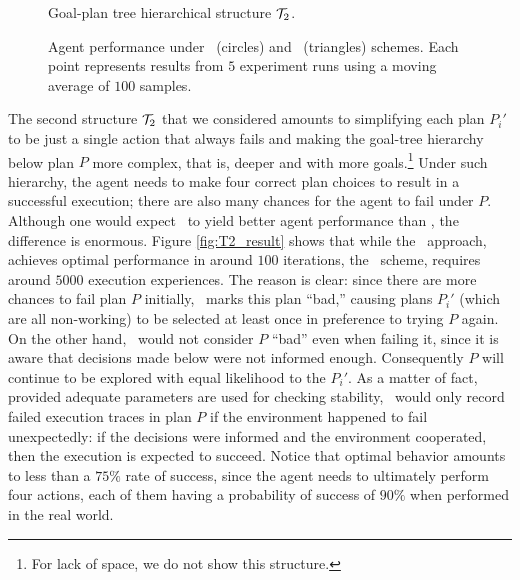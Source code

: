 \begin{figure}[t]
\begin{center}

\end{center}
\caption{Goal-plan tree hierarchical structure $\T_2$.}
\label{fig:T2}
\end{figure}


\begin{figure*}[t]
\begin{center}
\subfigure[Structure $\T_1$]{\label{fig:T1_result}

}
\qquad
\subfigure[Structure $\T_2$]{\label{fig:T2_result}

}
\qquad
\subfigure[Structure $\T_3$]{\label{fig:T3_result}

}
\caption{Agent performance under \BUL\ (circles) and \CL\ (triangles) schemes.
Each point represents results from $5$ experiment runs using a moving average of $100$ samples.}
\end{center}
\end{figure*}


The second structure $\T_2$ that we considered amounts to simplifying
each plan $P_i'$ to be just a single action that always fails and
making the goal-tree hierarchy below plan $P$ more complex, that is,
deeper and with more goals.\footnote{For lack of space, we do not show
this structure.}
%
Under such hierarchy, the agent needs to make four correct plan
choices to result in a successful execution; there are also many
chances for the agent to fail under $P$.
%
Although one would expect \BUL\ to yield better agent performance than
\CL, the difference is enormous. Figure \ref{fig:T2_result} shows
that while the \BUL\ approach, achieves optimal performance in around
$100$ iterations, the \CL\ scheme, requires around $5000$ execution
experiences.  
%
The reason is clear: since there are more chances to fail plan $P$
initially, \CL\ marks this plan ``bad,'' causing plans $P_i'$ (which
are all non-working) to be selected at least once in preference to
trying $P$ again. On the other hand, \BUL\ would not consider $P$
``bad'' even when failing it, since it is aware that decisions made 
below were not informed enough. Consequently $P$ will continue to be
explored with equal likelihood to the $P_i'$.
%
As a matter of fact,
provided adequate parameters are used for checking stability, \BUL\
would only record failed execution traces in plan $P$ if the
environment happened to fail unexpectedly: if the decisions were
informed and the environment cooperated, then the execution is
expected to succeed. 
%
Notice that optimal behavior amounts to less than a $75\%$ rate of
success, since the agent needs to ultimately perform four actions,
each of them having a probability of success of $90\%$ when performed
in the real world. 

